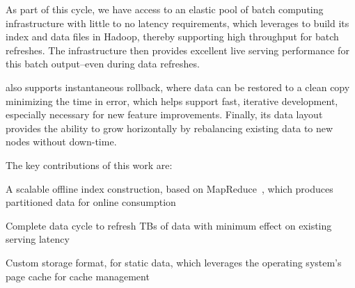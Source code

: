 As part of this cycle, we have access to an elastic pool of batch
computing infrastructure with little to no latency requirements, which
\projectname{} leverages to build its index and data files in Hadoop,
thereby supporting high throughput for batch refreshes. The \projectname{} 
infrastructure then provides excellent live serving performance for 
this batch output--even during data refreshes. 

\longpage
\projectname{} also supports instantaneous rollback, where data can be
restored to a clean copy minimizing the time in error, which helps
support fast, iterative development, especially necessary for new
feature improvements. Finally, its data layout provides the ability to grow
horizontally by rebalancing existing data to new nodes without down-time. 

The key contributions of this work are:
\begin{compactitem}
\item A scalable offline index construction, based on 
MapReduce~\cite{dean}, which produces partitioned data for online consumption
\item Complete data cycle to refresh TBs of data with minimum effect on
existing serving latency
\item Custom storage format, for static data, which leverages the 
operating system's page cache for cache management
\end{compactitem}

